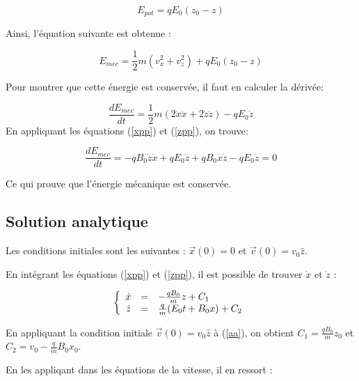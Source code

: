 \documentclass[a4paper,12pt,twoside]{article}
\begin{document}
			\begin{equation}
				E_{pot} = qE_0 (z_0-z)
			\end{equation}
		
		Ainsi, l'\'equation suivante est obtenue :
	
			\begin{equation}
				E_{mec} = \frac{1}{2}m(v_x^2+v_z^2) + qE_0(z_0 - z)
			\end{equation}
		
		Pour montrer que cette \'energie est conserv\'ee, il faut en calculer la d\'eriv\'ee:
	
			\begin{equation}
				\frac{dE_{mec}}{dt} = \frac{1}{2} m(2\dot{x}\ddot{x} + 2\dot{z}\ddot{z}) - 	qE_0\dot{z} 
			\end{equation}
		En appliquant les équations (\ref{xpp}) et (\ref{zpp}), on trouve:
	
			\begin{equation}
				\frac{dE_{mec}}{dt}= -qB_0\dot{z}\dot{x}+qE_0\dot{z}+qB_0\dot{x}\dot{z}-qE_0\dot{z} = 0
			\end{equation}
	
		Ce qui prouve que l'\'energie m\'ecanique est conserv\'ee.
	
	\subsection{Solution analytique}
	
		Les conditions initiales sont les suivantes : $\vec{x}(0) = 0$ et $ \vec{v}(0) = v_0\hat{z}$.
		
		En int\'egrant les \'equations (\ref{xpp}) et (\ref{zpp}), il est possible de trouver $\dot{x}$ et $\dot{z}$ :
		
			\begin{equation}\label{aa}
				\left \{
				\begin{array}{r c l}
					\dot{x} & = & -\frac{qB_0}{m}z + C_1  \\
					\dot{z} & = & \frac{q}{m} (E_0t + B_0x) + C_2\\
				\end{array}
				\right .
			\end{equation}
		
		En appliquant la condition initiale $ \vec{v}(0) = v_0\hat{z}$ à (\ref{aa}), on obtient $C_1 = \frac{qB_0}{m}z_0 $ et $C_2 = v_0 -\frac{q}{m}B_0x_0$.

			
		En les appliqant dans les \'equations de la vitesse, il en ressort :
				
\end{document}
